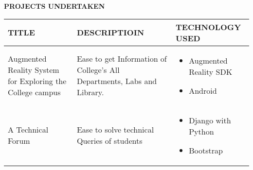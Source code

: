 \documentclass{article}
\begin{document}
\begin{minipage}{\textwidth}

\begin{framed}
	\large{\textbf{PROJECTS UNDERTAKEN}}
\end{framed}
\vspace{0.1cm}
\begin{comment}

\begin{itemize}
	\itemsep1pt \parskip0pt \parsep0pt
	\setlength{\itemsep}{0.1cm}%
	\setlength{\parskip}{0.2cm}%

	\item{
		\textbf{\large{A Technical Forum }}ease to solve technical Queries of students
		\begin{itemize}
			\item[$\circ$] {Duration : 3 Months}
			\item[$\circ$] {Team : 3 Members}
			\item[$\circ$] {My Role : Database backend design and implementation}
		\end{itemize}
	\textbf{Description:}\\
		\setlength{\parindent}{15pt}
		\indent This Project done by using \textbf{Django web Framework} which is written in python.
	}
\end{itemize}

\end{comment}



\setlength{\tabcolsep}{0.1em}
\def\arraystretch{1.7}
\begin{center}
\begin{tabularx}{\linewidth}{|X|X|X|}
	\hline
	 \centering\textbf{ TITLE} & \centering\textbf{DESCRIPTIOIN} & \textbf{TECHNOLOGY USED}\\
\hline 
	\centering 
		Augmented Reality System for Exploring the College campus
 	&
	\centering Ease to get Information of College's All Departments, Labs and Library. 
	&
	\begin{itemize}
		\item Augmented Reality SDK
		\item Android
	\end{itemize}\\
	\hline

	\centering A Technical Forum  & Ease to solve technical Queries of students &
	\begin{itemize}
		\item Django with Python
		\item Bootstrap
	\end{itemize} \\
	\hline
\end{tabularx}
\end{center}

\end{minipage}	
\end{document}
